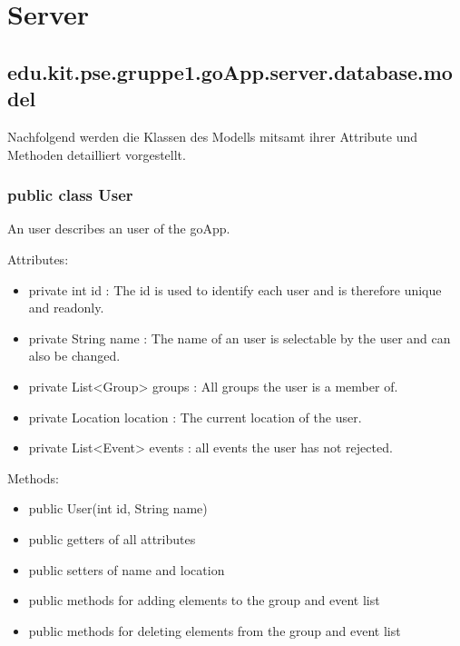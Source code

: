 
\section{Server}
	
	\hypertarget{database.model}{}
	\hypertarget{ServerModel}{}
	\subsection{edu.kit.pse.gruppe1.goApp.server.database.model}
Nachfolgend werden die Klassen des Modells mitsamt ihrer Attribute und Methoden detailliert vorgestellt.
	\subsubsection{public class User}
	An user describes an user of the goApp.
	
	Attributes:
	\begin{itemize}
	\item private int id : The id is used to identify each user and is therefore unique and readonly.
	\item private String name : The name of an user is selectable by the user and can also be changed.
	\item private List<Group> groups : All groups the user is a member of.
	\item private Location location : The current location of the user.
	\item private List<Event> events : all events the user has not rejected.
	\end{itemize}
	Methods: 
	\begin{itemize}
	\item public User(int id, String name)
	\item public getters of all attributes
	\item public setters of name and location
	\item public methods for adding elements to the group and event list
	\item public methods for deleting elements from the group and event list
	\end{itemize}

